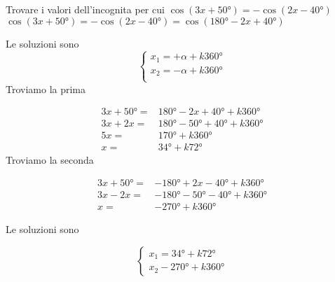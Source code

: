 \begin{exercise}
	Trovare i valori dell'incognita per cui $\cos(3x+\ang{50;;})=-\cos(2x-\ang{40;;})$
	\tcblower
$\cos(3x+\ang{50;;})=-\cos(2x-\ang{40;;})=\cos(\ang{180;;}-2x+\ang{40;;})$
	
	Le soluzioni sono 
	\[\begin{cases}
	x_1=+\alpha+k\ang{360;;}\\
	x_2=-\alpha+k\ang{360;;}\\
	\end{cases}\]
	Troviamo la prima
	
	\begin{align*}
	3x+\ang{50;;}=&\ang{180;;}-2x+\ang{40;;}+k\ang{360;;}\\
	3x+2x=&\ang{180;;}-\ang{50;;}+\ang{40;;}+k\ang{360;;}\\
	5x=&\ang{170;;}+k\ang{360;;}\\
	x=&\ang{34;;}+k\ang{72;;}
	\end{align*}
	Troviamo la seconda
	
	\begin{align*}
		3x+\ang{50;;}=&-\ang{180;;}+2x-\ang{40;;}+k\ang{360;;}\\
		3x-2x=&-\ang{180;;}-\ang{50;;}-\ang{40;;}+k\ang{360;;}\\
		x=&-\ang{270;;}+k\ang{360;;}
	\end{align*}
	
	Le soluzioni sono
	
	\[\begin{cases}
	x_1=\ang{34;;}+k\ang{72;;}\\
	x_2-\ang{270;;}+k\ang{360;;}
	\end{cases}\]
\end{exercise}

